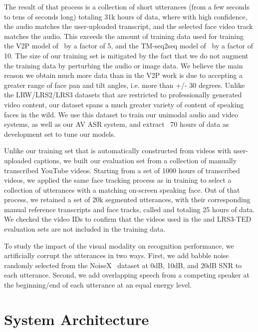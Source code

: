 \documentclass{article}
\newcommand{\negsectionspace}{\vspace{-4pt}}
\begin{document}
The result of that process is a collection of short utterances (from a
few seconds to tens of seconds long) totaling 31k hours of data, where
with high confidence, the audio matches the user-uploaded transcript,
and the selected face video track matches the audio.  This exceeds the
amount of training data used for training the V2P model
of~\citet{dm_lsvsr_2018} by a factor of 5, and the TM-seq2seq model
of~\citet{seq2seq14cho} by a factor of 10. The size of our training
set is mitigated by the fact that we do not augment the training data
by perturbing the audio or image data. We believe the main reason we
obtain much more data than in the V2P work is due to accepting a
greater range of face pan and tilt angles, i.e. more than +/- 30
degrees. Unlike the LRW/LRS2/LRS3 datasets that are restricted to
professionally generated video content, our dataset spans a much
greater variety of content of speaking faces in the wild. We use this
dataset to train our unimodal audio and video systems, as well as our
AV ASR system, and extract ~70 hours of data as development set to
tune our models.

Unlike our training set that is automatically constructed from videos
with user-uploaded captions, we built our evaluation set from a
collection of manually transcribed YouTube videos. Starting from a set
of 1000 hours of transcribed videos, we applied the same face tracking
process as in training to select a collection of utterances with a
matching on-screen speaking face. Out of that process, we retained a
set of 20k segmented utterances, with their corresponding manual
reference transcripts and face tracks, called \ytdev and totaling 25
hours of data.
We checked the video IDs to confirm that the videos used in
the \ytdev and LRS3-TED evaluation sets are not included
in the training data.

To study the impact of the visual modality on recognition performance,
we artificially corrupt the \ytdev utterances in two ways. First, we
add babble noise randomly selected from the NoiseX~\citet{noisex}
dataset at 0dB, 10dB, and 20dB SNR to each utterance. Second, we add
overlapping speech from a competing speaker at the beginning/end of
each utterance at an equal energy level.

\negsectionspace
\section{System Architecture}
\label{System Architecture}
\negsectionspace
\end{document}
